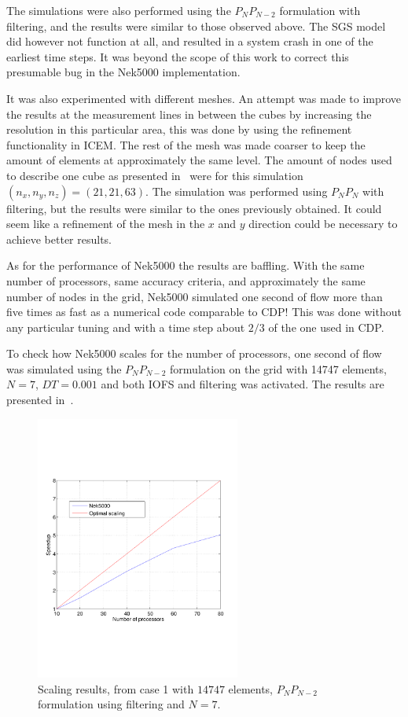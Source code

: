The simulations were also performed using the $P_NP_{N-2}$ formulation with filtering, and the 
results were similar to those observed above. The SGS model did however not function at all, 
and resulted in a system crash in one of the earliest time steps. It was beyond the scope of 
this work to correct this presumable bug in the Nek5000 implementation. 

It was also experimented with different meshes. An attempt was made to improve the 
results at the measurement lines in between the cubes by increasing the resolution in
this particular area, this was done by using the refinement functionality in ICEM.
The rest of the mesh was made coarser to keep the amount of elements at approximately the 
same level. The amount of nodes used to describe one cube as presented in~ 
were for this simulation $(n_x,n_y,n_z) = (21,21,63)$.
The simulation was performed using $P_NP_N$ with filtering, but the results were 
similar to the ones previously obtained. It could seem like a refinement of the 
mesh in the $x$ and $y$ direction could be necessary to achieve better results. 

As for the performance of Nek5000 the results are baffling. With the same number of processors,
same accuracy criteria, and approximately the same number of nodes in the grid, Nek5000 simulated
one second of flow more than five times as fast as a numerical code comparable to CDP! 
This was done without any particular tuning and with a time step about $2/3$ of the one used in 
CDP. 

To check how Nek5000 scales for the number of processors, one second of flow was 
simulated using the $P_NP_{N-2}$ formulation on the grid with 14747 elements,
$N=7$, $DT = 0.001$ and both IOFS and filtering was activated. The results 
are presented in~.
%
\begin{figure}[h!]
	\centerline{
        \includegraphics[trim=0.5cm 4cm 0.5cm 4cm, width=0.6\textwidth]{Figures/scalresults.pdf}}
        \caption{Scaling results, from case 1 with $14747$ elements, $P_NP_{N-2}$ formulation using filtering and $N=7$.}
	\label{fig:perfgas}
\end{figure}
%

